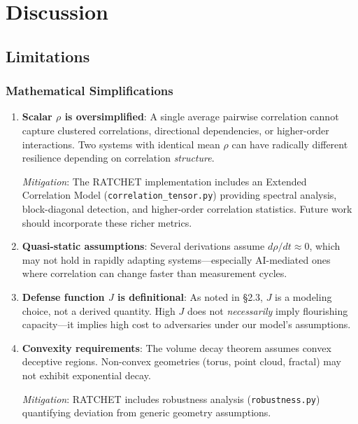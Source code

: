 \documentclass[11pt,a4paper]{article}
\theoremstyle{definition}
\theoremstyle{remark}
\begin{document}
\section{Discussion}

\subsection{Limitations}

\subsubsection{Mathematical Simplifications}

\begin{enumerate}
    \item \textbf{Scalar $\rho$ is oversimplified}: A single average pairwise correlation cannot capture clustered correlations, directional dependencies, or higher-order interactions. Two systems with identical mean $\rho$ can have radically different resilience depending on correlation \textit{structure}.

    \textit{Mitigation}: The RATCHET implementation includes an Extended Correlation Model (\texttt{correlation\_tensor.py}) providing spectral analysis, block-diagonal detection, and higher-order correlation statistics. Future work should incorporate these richer metrics.

    \item \textbf{Quasi-static assumptions}: Several derivations assume $d\rho/dt \approx 0$, which may not hold in rapidly adapting systems---especially AI-mediated ones where correlation can change faster than measurement cycles.

    \item \textbf{Defense function $J$ is definitional}: As noted in \S2.3, $J$ is a modeling choice, not a derived quantity. High $J$ does not \textit{necessarily} imply flourishing capacity---it implies high cost to adversaries under our model's assumptions.

    \item \textbf{Convexity requirements}: The volume decay theorem assumes convex deceptive regions. Non-convex geometries (torus, point cloud, fractal) may not exhibit exponential decay.

    \textit{Mitigation}: RATCHET includes robustness analysis (\texttt{robustness.py}) quantifying deviation from generic geometry assumptions.
\end{enumerate}
\end{document}
